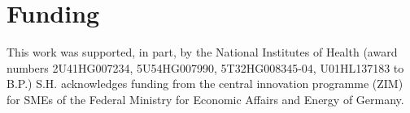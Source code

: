 \documentclass{bioinfo}
\begin{document}
%

\section*{Funding}

This work was supported, in part, by the National Institutes of Health (award numbers 2U41HG007234, 5U54HG007990, 5T32HG008345-04, U01HL137183 to B.P.)
S.H. acknowledges funding from the central innovation programme (ZIM) for SMEs of the Federal Ministry for Economic Affairs and Energy of Germany.


%
%
%
%
%
%
%











\end{document}
